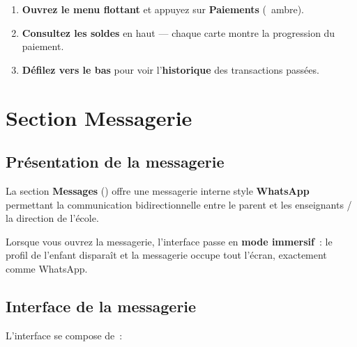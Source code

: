 \begin{etape}[title=Proc\'edure : V\'erifier les paiements]
\begin{enumerate}[leftmargin=1.5cm,label=\textbf{\arabic*.},itemsep=8pt]
  \item \textbf{Ouvrez le menu flottant} et appuyez sur \textbf{Paiements} (\faCreditCard\ ambre).
  \item \textbf{Consultez les soldes} en haut --- chaque carte montre la progression du paiement.
  \item \textbf{D\'efilez vers le bas} pour voir l'\textbf{historique} des transactions pass\'ees.
\end{enumerate}
\end{etape}

\newpage
\chapter{Section Messagerie}

\section{Pr\'esentation de la messagerie}

La section \textbf{Messages} (\faCommentDots) offre une messagerie interne style \textbf{WhatsApp} permettant la communication bidirectionnelle entre le parent et les enseignants / la direction de l'\'ecole.

\begin{info}
Lorsque vous ouvrez la messagerie, l'interface passe en \textbf{mode immersif}~: le profil de l'enfant dispara\^it et la messagerie occupe tout l'\'ecran, exactement comme WhatsApp.
\end{info}

\section{Interface de la messagerie}

L'interface se compose de~:


